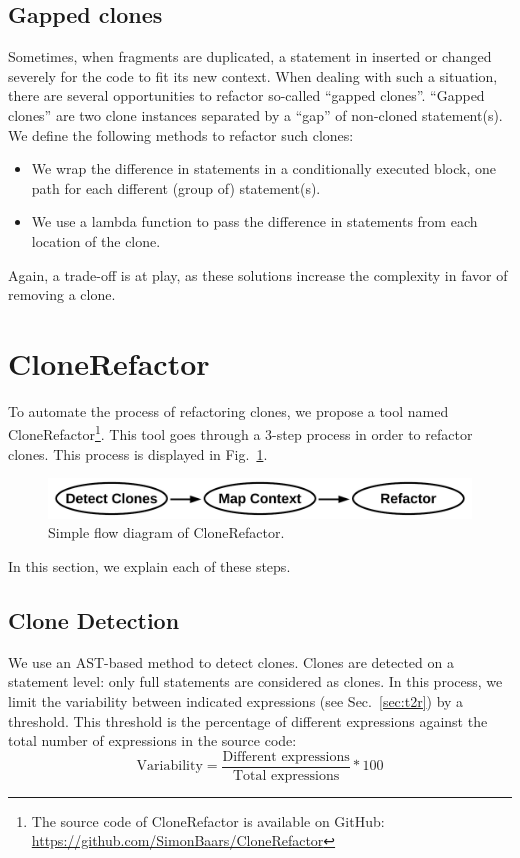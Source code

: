 \documentclass[sigconf,review, table]{acmart}
\begin{document}
\subsection{Gapped clones} \label{sec:t3r}
Sometimes, when fragments are duplicated, a statement in inserted or changed severely for the code to fit its new context. When dealing with such a situation, there are several opportunities to refactor so-called ``gapped clones''. ``Gapped clones'' are two clone instances separated by a ``gap'' of non-cloned statement(s). We define the following methods to refactor such clones:
\begin{itemize}
  \item We wrap the difference in statements in a conditionally executed block, one path for each different (group of) statement(s).
  \item We use a lambda function to pass the difference in statements from each location of the clone.
\end{itemize}
Again, a trade-off is at play, as these solutions increase the complexity in favor of removing a clone.

\section{CloneRefactor}
To automate the process of refactoring clones, we propose a tool named CloneRefactor\footnote{The source code of CloneRefactor is available on GitHub: \url{https://github.com/SimonBaars/CloneRefactor}}. This tool goes through a 3-step process in order to refactor clones. This process is displayed in Fig.~\ref{fig:clonerefactorflow}.
\begin{figure}[H]
  \includegraphics[width=1\columnwidth]{img/flow}
  \caption{Simple flow diagram of CloneRefactor.}
  \label{fig:clonerefactorflow}
\end{figure}
In this section, we explain each of these steps.

\subsection{Clone Detection}
We use an AST-based method to detect clones. Clones are detected on a statement level: only full statements are considered as clones. In this process, we limit the variability between indicated expressions (see Sec.~\ref{sec:t2r}) by a threshold. This threshold is the percentage of different expressions against the total number of expressions in the source code:
\begin{equation}\label{eq:type2r}
\text{Variability}=\frac{\text{Different expressions}}{\text{Total expressions}}*100
\end{equation}
\end{document}
